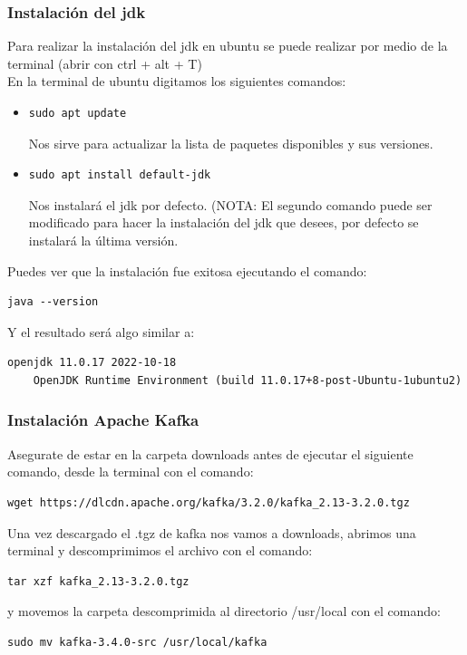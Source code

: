 \documentclass{article}
\begin{document}
\subsubsection{Instalación del jdk}
Para realizar la instalación del jdk en ubuntu se puede realizar por medio de la terminal (abrir con ctrl + alt + T)\\
En la terminal de ubuntu digitamos los siguientes comandos:
\begin{itemize}
    \item \begin{lstlisting}[numbers=none]
sudo apt update\end{lstlisting}
Nos sirve para actualizar la lista de paquetes disponibles y sus versiones.
    \item \begin{lstlisting}[numbers=none]
sudo apt install default-jdk\end{lstlisting}
Nos instalará el jdk por defecto. (NOTA: El segundo comando puede ser modificado para hacer la instalación del jdk que desees, por defecto se instalará la última versión.
\end{itemize}
Puedes ver que la instalación fue exitosa ejecutando el comando:
\begin{lstlisting}[numbers=none]
    java --version\end{lstlisting}
Y el resultado será algo similar a:
\begin{lstlisting}[numbers=none]
    openjdk 11.0.17 2022-10-18
    OpenJDK Runtime Environment (build 11.0.17+8-post-Ubuntu-1ubuntu2)\end{lstlisting}
\subsubsection{Instalación Apache Kafka}
Asegurate de estar en la carpeta downloads antes de ejecutar el siguiente comando, desde la terminal con el comando:
\begin{lstlisting}[numbers=none]
    wget https://dlcdn.apache.org/kafka/3.2.0/kafka_2.13-3.2.0.tgz\end{lstlisting}
Una vez descargado el .tgz de kafka nos vamos a downloads, abrimos una terminal y descomprimimos el archivo con el comando:
\begin{lstlisting}[numbers=none]
    tar xzf kafka_2.13-3.2.0.tgz \end{lstlisting}
y movemos la carpeta descomprimida al directorio /usr/local con el comando:
\begin{lstlisting}[numbers=none]
    sudo mv kafka-3.4.0-src /usr/local/kafka\end{lstlisting}
\end{document}
